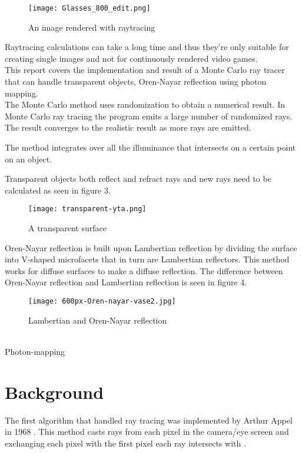 \documentclass[a4paper,12pt,oneside,final]{report}
\begin{document}
\begin{figure}[h!]
\begin{center}
\texttt{[image: Glasses\_800\_edit.png]}
\end{center}
\caption{An image rendered with raytracing}
\end{figure}

Raytracing calculations can take a long time and thus they're only suitable for creating single images and not for continuously rendered video games. 
\\
This report covers the implementation and result of a Monte Carlo ray tracer that can handle transparent objects, Oren-Nayar reflection using photon mapping.
\\
The Monte Carlo method uses randomization to obtain a numerical result. 
In Monte Carlo ray tracing the program emits a large number of randomized rays. The result converges to the realistic result as more rays are emitted\cite{Monte Carlo Method}.

The method integrates over all the illuminance that intersects on a certain point on an object\cite{Path tracing}.

Transparent objects both reflect and refract rays and new rays need to be calculated as seen in figure 3.
\begin{figure}[h!]
\begin{center}
\texttt{[image: transparent-yta.png]}
\end{center}
\caption{A transparent surface}
\end{figure}

Oren-Nayar reflection is built upon Lambertian reflection by dividing the surface into V-shaped microfacets that in turn are Lambertian reflectors. This method works for diffuse surfaces to make a diffuse reflection. The difference between Oren-Nayar reflection and Lambertian reflection is seen in figure 4.
\begin{figure}[h!]
\begin{center}
\texttt{[image: 600px-Oren-nayar-vase2.jpg]}
\end{center}
\caption{Lambertian and Oren-Nayar reflection}
\end{figure}
\\
Photon-mapping 
\section{Background}

The first algorithm that handled ray tracing was implemented by Arthur Appel in 1968 \cite{Arthur Appel}. This method casts rays from each pixel in the camera/eye screen and exchanging each pixel with the first pixel each ray intersects with \cite{Basic Raytracing}. 
\end{document}
